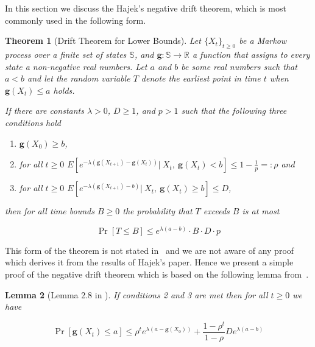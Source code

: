 \documentclass[12pt, a4paper]{article}
\newcommand{\gfun}{\mathbf{g}}
\newtheorem{theorem}{Theorem}[section]
\newtheorem{lemma}[theorem]{Lemma}
\theoremstyle{remark}
\begin{document}
In this section we discuss the Hajek's negative drift theorem, which is most commonly used in the following form.

\begin{theorem}[Drift Theorem for Lower Bounds] \label{thm:neat}
    Let $\{X_t\}_{t \ge 0}$ be a Markow process over a finite set of states $\mathbb{S}$, and $\mathbf{g} : \mathbb{S} \rightarrow \mathbb{R}$ a function that assigns to every state a non-negative real numbers. Let $a$ and $b$ be some real numbers such that $a < b$ and let the random variable $T$ denote
    the earliest point in time $t$ when $\mathbf{g}(X_t) \leq a$ holds.

    If there are constants $\lambda > 0$, $D \ge 1$, and $p > 1$ such that the following three conditions hold
    \renewcommand\labelenumi{(\theenumi)}
    \begin{enumerate}
        \item $\gfun(X_0) \ge b$,
        \item for all \(t \geq 0\) $ E\left[e^{-\lambda(\gfun(X_{t + 1}) - \gfun(X_t))} \Big|\ X_t,\ \gfun(X_t) < b\right] \leq 1 - \frac{1}{p} =: \rho$ and
        \item for all \(t \geq 0\) $ E\left[e^{-\lambda(\gfun(X_{t + 1}) - b)} \Big|\ X_t,\ \gfun(X_t) \ge b\right] \leq D$,
    \end{enumerate}
    then for all time bounds $B \ge 0$ the probability that $T$ exceeds $B$ is at most

    \begin{equation}
        \Pr[T \leq B] \leq e^{\lambda(a - b)} \cdot B \cdot D \cdot p
    \end{equation}
\end{theorem}

This form of the theorem is not stated in~\cite{Hajek82} and we are not aware of any proof which derives it from the results of Hajek's paper. Hence we present a simple proof of the negative drift theorem which is based on the following lemma from~\cite{Hajek82}.

\begin{lemma}[Lemma 2.8 in \cite{Hajek82}] \label{lm:haj}
    If conditions 2 and 3 are met then for all $t \geq 0$ we have

    $$\Pr[\gfun(X_t) \leq a] \leq \rho^te^{\lambda(a - \gfun(X_0))} + \frac{1 - \rho^t}{1 - \rho} D e^{\lambda(a - b)}$$

\end{lemma}
\end{document}
